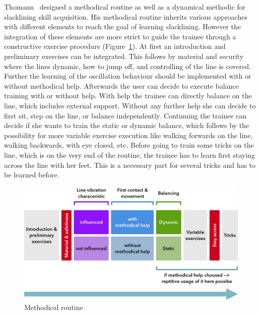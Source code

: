 Thomann~\cite{Thomann2013-aa} designed a methodical routine as well as a dynamical methodic for slacklining skill acquisition. His methodical routine inherits various approaches with different elements to reach the goal of learning slacklining. However the integration of these elements are more strict to guide the trainee through a constructive exercise procedure (Figure~\ref{fig:3_3_1_methodicalRoutine}). At first an introduction and preliminary exercises can be integrated. This follows by material and security where the lines dynamic, how to jump off, and controlling of the line is covered. Further the learning of the oscillation behaviour should be implemented with or without methodical help. Afterwards the user can decide to execute balance training with or without help. With help the trainee can directly balance on the line, which includes external support. Without any further help she can decide to first sit, step on the line, or balance independently. Continuing the trainee can decide if she wants to train the static or dynamic balance, which follows by the possibility for more variable exercise execution like walking forwards on the line, walking backwards, with eye closed, etc. Before going to train some tricks on the line, which is on the very end of the routine, the trainee has to learn first staying across the line with her feet. This is a necessary part for several tricks and has to be learned before.
\begin{figure}[htb]
	\centering
	\begin{minipage}[t]{1\linewidth}
		\centering
		\includegraphics[width=1\linewidth]{Pictures/3_3_1_methodicalRoutine3}
		\caption{Methodical routine~\cite{Thomann2013-aa}}
		\label{fig:3_3_1_methodicalRoutine}
	\end{minipage}
\end{figure}

